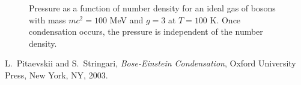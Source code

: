 \documentclass[pdftex]{article}    %
\begin{document}
\begin{figure}[htp]
\centering
{}
\caption{
Pressure as a function of number density for an ideal gas of bosons
with mass $mc^2 = 100$ MeV and $g = 3$ at $T = 100$ K.  Once condensation
occurs, the pressure is independent of the number density.
}
\label{fig:bec_p}
\end{figure}



\begin{thebibliography}{1}

{\sc L.~{Pitaevskii} and S.~{Stringari}}, {\em {Bose-Einstein Condensation}},
  Oxford University Press, New York, NY, 2003.

\end{thebibliography}
\end{document}
